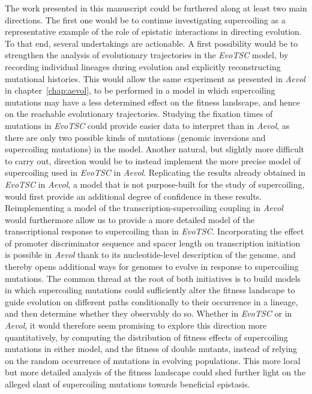 The work presented in this manuscript could be furthered along at least two main directions.
The first one would be to continue investigating supercoiling as a representative example of the role of epistatic interactions in directing evolution.
To that end, several undertakings are actionable.
A first possibility would be to strengthen the analysis of evolutionary trajectories in the \emph{EvoTSC} model, by recording individual lineages during evolution and explicitly reconstructing mutational histories.
This would allow the same experiment as presented in \emph{Aevol} in chapter~\ref{chap:aevol}, to be performed in a model in which supercoiling mutations may have a less determined effect on the fitness landscape, and hence on the reachable evolutionary trajectories.
Studying the fixation times of mutations in \emph{EvoTSC} could provide easier data to interpret than in \emph{Aevol}, as there are only two possible kinds of mutations (genomic inversions and supercoiling mutations) in the model.
Another natural, but slightly more difficult to carry out, direction would be to instead implement the more precise model of supercoiling used in \emph{EvoTSC} in \emph{Aevol}.
Replicating the results already obtained in \emph{EvoTSC} in \emph{Aevol}, a model that is not purpose-built for the study of supercoiling, would first provide an additional degree of confidence in these results.
Reimplementing a model of the transcription-supercoiling coupling in \emph{Aevol} would furthermore allow us to provide a more detailed model of the transcriptional response to supercoiling than in \emph{EvoTSC}.
Incorporating the effect of promoter discriminator sequence and spacer length on transcription initiation~\citep{forquet2021,pineau2022a} is possible in \emph{Aevol} thank to its nucleotide-level description of the genome, and thereby opens additional ways for genomes to evolve in response to supercoiling mutations.
The common thread at the root of both initiatives is to build models in which supercoiling mutations could sufficiently alter the fitness landscape to guide evolution on different paths conditionally to their occurrence in a lineage, and then determine whether they observably do so.
Whether in \emph{EvoTSC} or in \emph{Aevol}, it would therefore seem promising to explore this direction more quantitatively, by computing the distribution of fitness effects of supercoiling mutations in either model, and the fitness of double mutants, instead of relying on the random occurrence of mutations in evolving populations.
This more local but more detailed analysis of the fitness landscape could shed further light on the alleged slant of supercoiling mutations towards beneficial epistasis.

